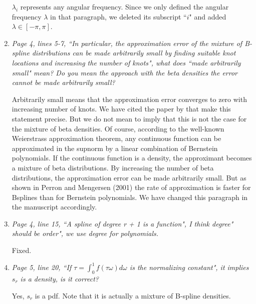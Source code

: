 \documentclass{scrartcl}
\newcommand{\refereeQuote}{\textit }
\newcommand{\response}{}
\begin{document}
\begin{enumerate}
	\response{$\lambda_i$ represents any angular frequency. Since we only defined the angular frequency $\lambda$ in that paragraph, we deleted its subscript ``$i$" and added $\lambda\in[-\pi,\pi]$. } \bigskip
	
	\item \refereeQuote{ Page 4, lines 5-7, ``In particular, the approximation error of the mixture of B-spline distributions can be made arbitrarily small by finding suitable knot locations and increasing the number of knots", what does ``made arbitrarily small" mean? Do you mean the approach with the beta densities the error cannot be made arbitrarily small?}\smallskip
	
	\response{Arbitrarily small means that the approximation error converges to zero with increasing number of knots. We have  cited the paper by \cite{Perron:2001} that make this statement precise. But we do not mean to imply that this is not the case for the mixture of beta densities. Of course, according to the well-known Weierstrass approximation theorem, any continuous function can be approximated in the supnorm by a linear combination of Bernstein polynomials. If the continuous function is a density, the approximant becomes a mixture of beta distributions. By increasing the number of beta distributions, the approximation error can be made arbitrarily small. But as shown in Perron and Mengersen (2001) the rate of approximation is faster for Bsplines than for Bernstein polynomials. We have changed this paragraph in the manuscript accordingly.}

	
	\item \refereeQuote{Page 4, line 15, ``A spline of degree r + 1 is a function", I think degree" should be order", we use degree for polynomials.}\smallskip
	
	\response{Fixed.} \bigskip	
	
	\item \refereeQuote{Page 5, line 20, ``If $\tau = \int_0^1f(\tau \omega)d \omega$ is the normalizing constant", it implies $s_r$ is a density, is it correct?}
	
	\response{Yes, $s_r$ is a pdf.  Note that it is actually a mixture of B-spline densities.}
\end{enumerate}
\end{document}
